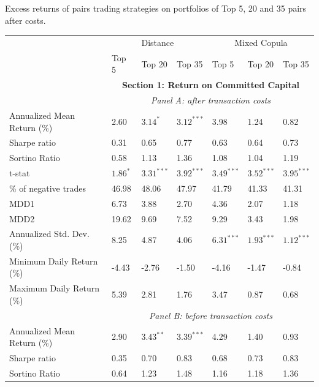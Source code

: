 \begin{threeparttable}[H]
	\centering \scriptsize
	\caption{Excess returns of pairs trading strategies on portfolios of Top 5, 20 and 35 pairs after costs.}
	\begin{tabularx}{\textwidth}{@{\extracolsep{\fill}}lllllll@{}}
		\toprule
		& \multicolumn{3}{c}{Distance} & \multicolumn{3}{c}{Mixed Copula} \\\cmidrule{2-4} \cmidrule{5-7}
		& Top 5 & Top 20 & Top 35 & Top 5 & Top 20 & Top 35 \\
		\midrule
		& \multicolumn{6}{c}{\textbf{Section 1: Return on Committed Capital}} \\
		& \multicolumn{6}{c}{\textit {Panel A: after transaction costs}} \\
		Annualized Mean Return (\%) & 2.60  & $3.14^{*}$  & $3.12^{***}$  & 3.98  & 1.24  & 0.82 \\
		Sharpe ratio & 0.31  & 0.65  & 0.77  & 0.63  & 0.64  & 0.73 \\
		Sortino Ratio & 0.58  & 1.13  & 1.36  & 1.08  & 1.04  & 1.19 \\
		t-stat & $1.86^{*}$  & $3.31^{***}$  & $3.92^{***}$  & $3.49^{***}$  & $3.52^{***}$  & $3.95^{***}$ \\
		\% of negative trades & 46.98 & 48.06 & 47.97 & 41.79 & 41.33 & 41.31 \\
		MDD1  & 6.73  & 3.88  & 2.70  & 4.36  & 2.07  & 1.18 \\
		MDD2  & 19.62 & 9.69  & 7.52  & 9.29  & 3.43  & 1.98 \\
		Annualized Std. Dev. (\%) & 8.25  & 4.87  & 4.06  & $6.31^{***}$  & $1.93^{***}$  & $1.12^{***}$ \\
		Minimum Daily Return (\%) & -4.43 & -2.76 & -1.50 & -4.16 & -1.47 & -0.84 \\
		Maximum Daily Return (\%) & 5.39  & 2.81  & 1.76  & 3.47  & 0.87  & 0.68 \\
		\midrule
		& \multicolumn{6}{c}{\textit {Panel B: before transaction costs}} \\
		Annualized Mean Return (\%) & 2.90  & $3.43^{**}$  & $3.39^{***}$  & 4.29  & 1.40  & 0.93 \\
		Sharpe ratio & 0.35  & 0.70  & 0.83  & 0.68  & 0.73  & 0.83 \\
		Sortino Ratio & 0.64  & 1.23  & 1.48  & 1.16  & 1.18  & 1.36 \\

\end{tabularx}
\end{threeparttable}
